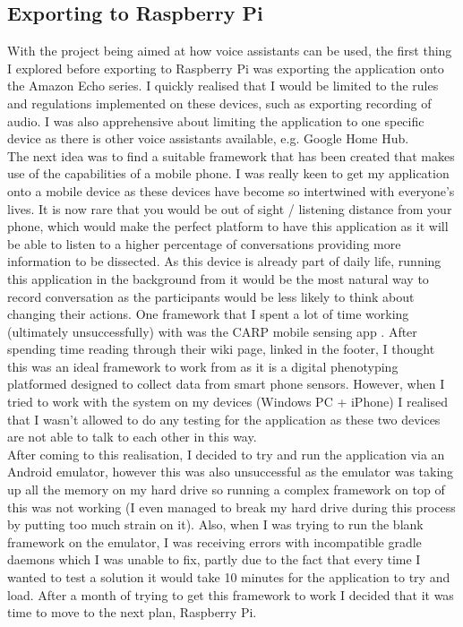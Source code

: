 \documentclass[a4paper,11pt]{report}
\begin{document}
\subsection{Exporting to Raspberry Pi}
With the project being aimed at how voice assistants can be used, the first thing I explored before exporting to Raspberry Pi was exporting the application onto the Amazon Echo series. I quickly realised that I would be limited to the rules and regulations implemented on these devices, such as exporting recording of audio. I was also apprehensive about limiting the application to one specific device as there is other voice assistants available, e.g. Google Home Hub.\\

The next idea was to find a suitable framework that has been created that makes use of the capabilities of a mobile phone. I was really keen to get my application onto a mobile device as these devices have become so intertwined with everyone’s lives. It is now rare that you would be out of sight / listening distance from your phone, which would make the perfect platform to have this application as it will be able to listen to a higher percentage of conversations providing more information to be dissected. As this device is already part of daily life, running this application in the background from it would be the most natural way to record conversation as the participants would be less likely to think about changing their actions. One framework that I spent a lot of time working (ultimately unsuccessfully) with was the CARP mobile sensing app . After spending time reading through their wiki page, linked in the footer, I thought this was an ideal framework to work from as it is a digital phenotyping platformed designed to collect data from smart phone sensors. However, when I tried to work with the system on my devices (Windows PC + iPhone) I realised that I wasn’t allowed to do any testing for the application as these two devices are not able to talk to each other in this way. \\

After coming to this realisation, I decided to try and run the application via an Android emulator, however this was also unsuccessful as the emulator was taking up all the memory on my hard drive so running a complex framework on top of this was not working (I even managed to break my hard drive during this process by putting too much strain on it). Also, when I was trying to run the blank framework on the emulator, I was receiving errors with incompatible gradle daemons which I was unable to fix, partly due to the fact that every time I wanted to test a solution it would take 10 minutes for the application to try and load. After a month of trying to get this framework to work I decided that it was time to move to the next plan, Raspberry Pi.\\
\end{document}
